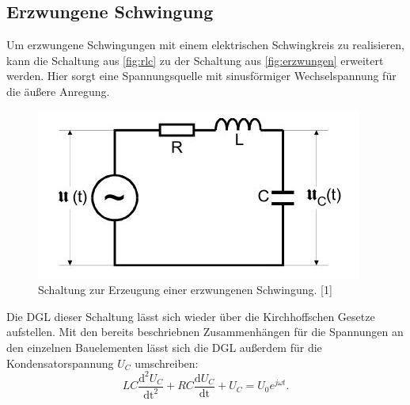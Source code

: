 \documentclass[
  bibliography=totoc,     %
  captions=tableheading,  %
  titlepage=firstiscover, %
]{scrartcl}
\begin{document}
  \subsection{Erzwungene Schwingung}
  Um erzwungene Schwingungen mit einem elektrischen Schwingkreis zu realisieren, kann die Schaltung aus \autoref{fig:rlc} zu der Schaltung aus \autoref{fig:erzwungen} erweitert werden. Hier sorgt eine Spannungsquelle mit sinusförmiger Wechselspannung für die äußere Anregung.
  \begin{figure}[h]
      \centering
      \includegraphics{erzwungen.JPG}
      \caption{Schaltung zur Erzeugung einer erzwungenen Schwingung. [1]}
      \label{fig:erzwungen}
    \end{figure}
  \noindent
  Die DGL dieser Schaltung lässt sich wieder über die Kirchhoffschen Gesetze aufstellen. Mit den bereits beschriebnen Zusammenhängen für die Spannungen an den einzelnen Bauelementen lässt sich die DGL außerdem für die Kondensatorspannung $U_C$ umschreiben:
  \begin{equation}
      LC \frac{\text{d}^2 U_C}{\text{dt}^2} + RC \frac{\text{d} U_C}{\text{dt}} + U_C = U_0 e^{j \omega t}.
  \end{equation}
      
\end{document}
